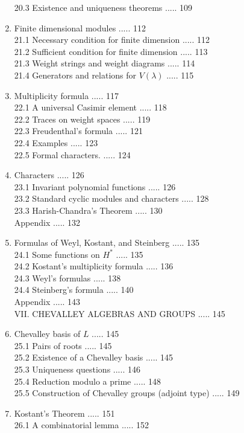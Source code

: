 \documentclass[10pt]{article}
\begin{document}
\begin{enumerate}
20.3 Existence and uniqueness theorems ..... 109
  \item Finite dimensional modules ..... 112\\
21.1 Necessary condition for finite dimension ..... 112\\
21.2 Sufficient condition for finite dimension ..... 113\\
21.3 Weight strings and weight diagrams ..... 114\\
21.4 Generators and relations for $V(\lambda)$ ..... 115
  \item Multiplicity formula ..... 117\\
22.1 A universal Casimir element ..... 118\\
22.2 Traces on weight spaces ..... 119\\
22.3 Freudenthal's formula ..... 121\\
22.4 Examples ..... 123\\
22.5 Formal characters. ..... 124
  \item Characters ..... 126\\
23.1 Invariant polynomial functions ..... 126\\
23.2 Standard cyclic modules and characters ..... 128\\
23.3 Harish-Chandra's Theorem ..... 130\\
Appendix ..... 132
  \item Formulas of Weyl, Kostant, and Steinberg ..... 135\\
24.1 Some functions on $H^{*}$ ..... 135\\
24.2 Kostant's multiplicity formula ..... 136\\
24.3 Weyl's formulas ..... 138\\
24.4 Steinberg's formula ..... 140\\
Appendix ..... 143\\
VII. CHEVALLEY ALGEBRAS AND GROUPS ..... 145
  \item Chevalley basis of $L$ ..... 145\\
25.1 Pairs of roots ..... 145\\
25.2 Existence of a Chevalley basis ..... 145\\
25.3 Uniqueness questions ..... 146\\
25.4 Reduction modulo a prime ..... 148\\
25.5 Construction of Chevalley groups (adjoint type) ..... 149
  \item Kostant's Theorem ..... 151\\
26.1 A combinatorial lemma ..... 152\\

\end{enumerate}
\end{document}
